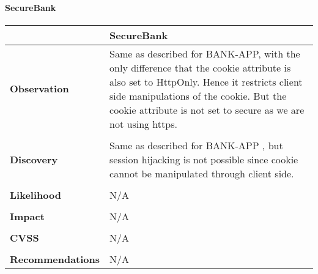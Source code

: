 \paragraph{SecureBank} \mbox{}
\begin{longtable*}{p{.30\textwidth} | p{.70\textwidth}}
    \hline
    & \textbf{SecureBank} \\
    \hline
    \textbf{Observation} &
      Same as described for BANK-APP, with the only difference that the cookie attribute is also set to HttpOnly. Hence it restricts client side manipulations of the cookie. But the cookie attribute is not set to secure as we are not using https. 
    \\\\
    \textbf{Discovery} &
      Same as described for BANK-APP , but session hijacking is not possible since cookie cannot be manipulated through client side.
    \\\\
    \textbf{Likelihood} &
        N/A
    \\\\
    \textbf{Impact} &
        N/A
    \\\\
    \textbf{CVSS} &
        N/A
    \\\\
    \textbf{Recommendations} &
     N/A\\
     \hline
\end{longtable*}
\clearpage